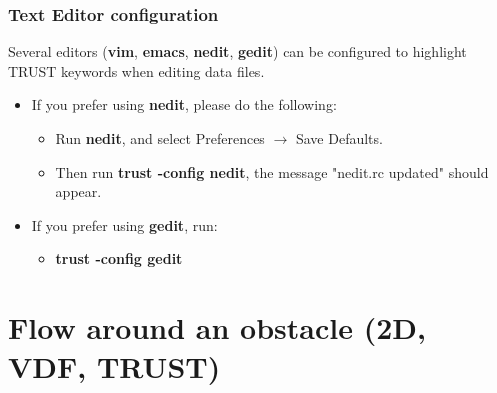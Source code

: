 \documentclass[10pt, hyperref={unicode=true,pdfusetitle, bookmarks=true,bookmarksnumbered=false,bookmarksopen=false, breaklinks=false,pdfborder={0 0l 1},backref=true,colorlinks=true,linkcolor=darkblue,pageanchor}]{beamer}
\begin{document}
\begin{frame}
\frametitle{Text Editor configuration}
\begin{block}{}
Several editors (\textbf{vim}, \textbf{emacs}, \textbf{nedit}, \textbf{gedit}) can be configured to highlight TRUST keywords when editing data files.

\begin{itemize}
 \item If you prefer using \textbf{nedit}, please do the following:
    \begin{itemize}
    \item [$\circ$] Run \textbf{nedit}, and select Preferences $\rightarrow$ Save Defaults.
    \item [$\circ$] Then run \textbf{trust -config nedit}, the message "nedit.rc updated" should appear.
    \end{itemize}

 \item If you prefer using \textbf{gedit}, run:
    \begin{itemize}
    \item [$\circ$] \textbf{trust -config gedit}
    \end{itemize}

\end{itemize}

\end{block}
\end{frame}

\section{{\bf{Flow around an obstacle (2D, VDF, TRUST)}}} \label{exo1}
\end{document}
